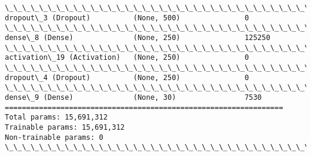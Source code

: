 \documentclass[11pt]{article}
\begin{document}
\begin{Verbatim}[commandchars=\\\{\}]
\_\_\_\_\_\_\_\_\_\_\_\_\_\_\_\_\_\_\_\_\_\_\_\_\_\_\_\_\_\_\_\_\_\_\_\_\_\_\_\_\_\_\_\_\_\_\_\_\_\_\_\_\_\_\_\_\_\_\_\_\_\_\_\_\_
dropout\_3 (Dropout)          (None, 500)               0         
\_\_\_\_\_\_\_\_\_\_\_\_\_\_\_\_\_\_\_\_\_\_\_\_\_\_\_\_\_\_\_\_\_\_\_\_\_\_\_\_\_\_\_\_\_\_\_\_\_\_\_\_\_\_\_\_\_\_\_\_\_\_\_\_\_
dense\_8 (Dense)              (None, 250)               125250    
\_\_\_\_\_\_\_\_\_\_\_\_\_\_\_\_\_\_\_\_\_\_\_\_\_\_\_\_\_\_\_\_\_\_\_\_\_\_\_\_\_\_\_\_\_\_\_\_\_\_\_\_\_\_\_\_\_\_\_\_\_\_\_\_\_
activation\_19 (Activation)   (None, 250)               0         
\_\_\_\_\_\_\_\_\_\_\_\_\_\_\_\_\_\_\_\_\_\_\_\_\_\_\_\_\_\_\_\_\_\_\_\_\_\_\_\_\_\_\_\_\_\_\_\_\_\_\_\_\_\_\_\_\_\_\_\_\_\_\_\_\_
dropout\_4 (Dropout)          (None, 250)               0         
\_\_\_\_\_\_\_\_\_\_\_\_\_\_\_\_\_\_\_\_\_\_\_\_\_\_\_\_\_\_\_\_\_\_\_\_\_\_\_\_\_\_\_\_\_\_\_\_\_\_\_\_\_\_\_\_\_\_\_\_\_\_\_\_\_
dense\_9 (Dense)              (None, 30)                7530      
=================================================================
Total params: 15,691,312
Trainable params: 15,691,312
Non-trainable params: 0
\_\_\_\_\_\_\_\_\_\_\_\_\_\_\_\_\_\_\_\_\_\_\_\_\_\_\_\_\_\_\_\_\_\_\_\_\_\_\_\_\_\_\_\_\_\_\_\_\_\_\_\_\_\_\_\_\_\_\_\_\_\_\_\_\_

    \end{Verbatim}
\end{document}
